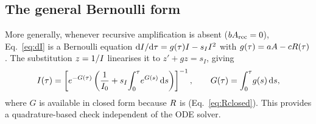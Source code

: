 \subsection{The general Bernoulli form}

More generally, whenever recursive amplification is absent ($bA_{\mathrm{rec}} = 0$),
Eq.~\eqref{eq:dI} is a Bernoulli equation
$\mathrm{d}I/\mathrm{d}\tau = g(\tau)I - s_II^{2}$ with
$g(\tau) = aA - cR(\tau)$. The substitution $z = 1/I$ linearises it to
$z' + g z = s_I$, giving
\begin{equation}
  I(\tau) = \left[e^{-G(\tau)}\left(\frac{1}{I_0}
    + s_I\!\int_0^{\tau}\! e^{G(s)}\,\mathrm{d}s\right)\right]^{-1},
  \qquad G(\tau) = \int_0^{\tau}\! g(s)\,\mathrm{d}s ,
\end{equation}
where $G$ is available in closed form because $R$ is
(Eq.~\eqref{eq:Rclosed}). This provides a quadrature-based check independent of
the ODE solver.
